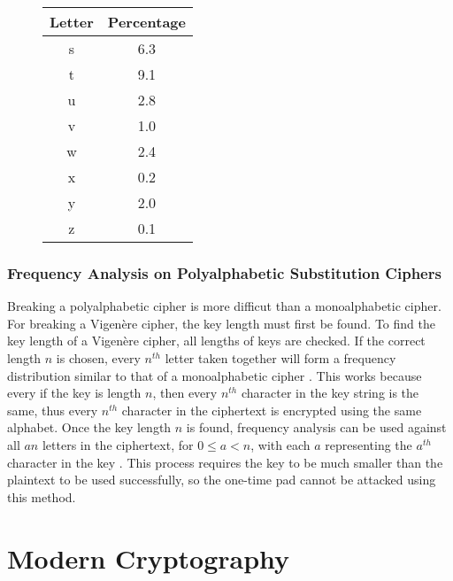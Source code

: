\documentclass[12pt]{article}
\begin{document}
\begin{figure}[ht]
\begin{center}
\begin{multicols}{3}
			\columnbreak
			
			\begin{tabular}{||c | c||}
				\hline
				Letter & Percentage \\
				\hline\hline
				s & 6.3 \\ 
				\hline 
				t & 9.1 \\
				\hline 
				u & 2.8 \\
				\hline 
				v & 1.0 \\
				\hline 
				w & 2.4 \\
				\hline
				x & 0.2 \\
				\hline
				y & 2.0 \\
				\hline 
				z & 0.1 \\
				\hline 
			\end{tabular}
		\end{multicols}
	\end{center}
	\begin{flushright}
		\cite[pg. 19]{codebook}
	\end{flushright}
\end{figure}

\subsubsection{Frequency Analysis on Polyalphabetic Substitution Ciphers}
Breaking a polyalphabetic cipher is more difficut than a monoalphabetic cipher. For breaking a Vigen\`{e}re cipher, the key length must first be found. To find the key length of a Vigen\`{e}re cipher, all lengths of keys are checked. If the correct length $n$ is chosen, every $n^{th}$ letter taken together will form a frequency distribution similar to that of a monoalphabetic cipher \cite[pg. 72,73]{codebook}. This works because every if the key is length $n$, then every $n^{th}$ character in the key string is the same, thus every $n^{th}$ character in the ciphertext is encrypted using the same alphabet. Once the key length $n$ is found, frequency analysis can be used against all $an$ letters in the ciphertext, for $0\leq a < n$, with each $a$ representing the $a^{th}$ character in the key \cite[pg. 74-76]{codebook}. This process requires the key to be much smaller than the plaintext to be used successfully, so the one-time pad cannot be attacked using this method.

\section{Modern Cryptography}
\end{document}
